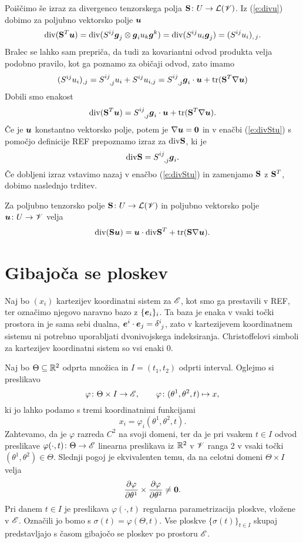 Poiščimo še izraz za divergenco tenzorskega polja $\mathbf S\colon U\to\mathcal L(\mathscr V)$.
Iz (\ref{e:divu}) dobimo za poljubno vektorsko polje $\boldsymbol u$
\[
	\mathrm{div}(\mathbf S^{T}\boldsymbol u)=\mathrm{div}(S^{ij}\boldsymbol g_j\otimes\boldsymbol g_i u_k\boldsymbol g^k)
	=\mathrm{div}(S^{ij}u_i\boldsymbol g_j)=(S^{ij}u_i)_{,\,j}.
\]
Bralec se lahko sam prepriča, da tudi za kovariantni odvod produkta velja
podobno pravilo, kot ga poznamo za običaji odvod, zato imamo
\[
	(S^{ij}u_i)_{,j}=\topbot{S}{ij}{,j}u_i+S^{ij}u_{i,j}=
	\topbot{S}{ij}{,j}\vek{g}_i\cdot\vek{u}+\tr(\ten{S}^{T}\nabla\vek{u})
\]
Dobili smo enakost
\begin{equation} \label{e:divStu}
	\div(\ten{S}^{T}\vek{u})=\topbot{S}{ij}{,j}\vek{g}_i\cdot\vek{u}+\tr(\ten{S}^{T}\nabla\vek{u}).
\end{equation}
Če je $\boldsymbol u$ konstantno vektorsko polje, potem je $\nabla\boldsymbol u=\mathbf 0$ in v
enačbi (\ref{e:divStu}) s pomočjo definicije REF prepoznamo izraz za $\mathrm{div}\mathbf S$, ki je
\[
	\div\ten{S}=\topbot{S}{ij}{,j}\vek{g}_i.
\]
Če dobljeni izraz vstavimo nazaj v enačbo (\ref{e:divStu}) in zamenjamo $\mathbf S$ z
$\mathbf S^{T}$, dobimo naslednjo trditev.
\begin{trditev} \label{e:divSu}
	Za poljubno tenzorsko polje $\mathbf S\colon U\to\mathcal L(\mathscr V)$ in poljubno
	vektorsko polje $\boldsymbol u\colon U\to\mathscr V$ velja
	\[ \mathrm{div}(\mathbf S\boldsymbol u)=\boldsymbol u\cdot\mathrm{div}\mathbf S^{T}+\mathrm{tr}(\mathbf S\nabla\boldsymbol u). \]
\end{trditev}


\section{Gibajoča se ploskev}


Naj bo $(x_i)$ kartezijev koordinatni sistem za $\mathscr E$, kot smo ga prestavili v REF, ter označimo
njegovo naravno bazo z $\{\boldsymbol e_i\}_i$. Ta baza je enaka v vsaki točki prostora in je sama
sebi dualna, $\vek{e}^i\cdot\vek{e}_j=\topbot{\delta}{i}{j}$, zato v kartezijevem
koordinatnem sistemu ni potrebno uporabljati dvonivojskega indeksiranja.
Christoffelovi simboli za kartezijev koordinatni sistem so vsi enaki 0.

Naj bo $\Theta\subseteq\mathbb R^2$ odprta množica in $I=(t_1,t_2)$ odprti interval.
Oglejmo si preslikavo
\begin{equation*}
	\varphi\colon\Theta\times I\to\mathscr E,\qquad \varphi\colon(\theta^1,\theta^2,t)\mapsto x,
\end{equation*}
ki jo lahko podamo s tremi koordinatnimi funkcijami
\[
	x_i=\varphi_i(\theta^1,\theta^2,t).
\]
Zahtevamo, da je $\varphi$ razreda $C^2$ na svoji domeni, ter da je pri vsakem $t\in I$ 
odvod preslikave $\varphi(\cdot,t)\colon \Theta\to\mathscr E$ linearna preslikava iz $\mathbb R^2$ v $\mathscr V$ ranga 2 v vsaki
točki $(\theta^1,\theta^2)\in\Theta$. Slednji pogoj je ekvivalenten temu, da na celotni domeni
$\Theta\times I$ velja
\[ \frac{\partial\varphi}{\partial\theta^1}\times\frac{\partial\varphi}{\partial\theta^2}\neq \boldsymbol 0. \]
Pri danem $t\in I$ je preslikava $\varphi(\cdot,t)$ regularna parametrizacija ploskve,
vložene v $\mathscr E$. Označili jo bomo s $\sigma(t)=\varphi(\Theta,t)$. Vse ploskve $\{\sigma(t)\}_{t\in I}$
skupaj predstavljajo s časom gibajočo se ploskev po prostoru $\mathscr E$.

